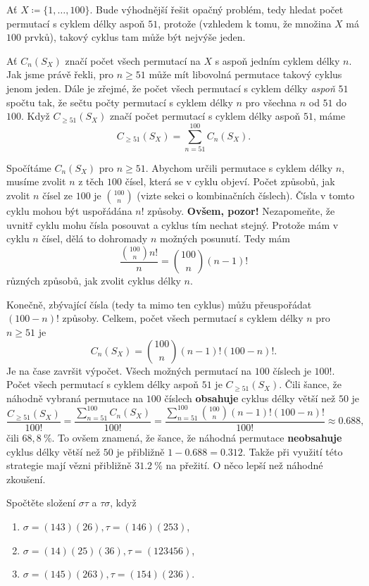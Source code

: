 Ať $X \coloneqq \{1,\ldots,100\}$. Bude výhodnější řešit opačný problém, tedy
hledat počet permutací s cyklem délky aspoň $51$, protože (vzhledem k tomu, že
množina $X$ má $100$ prvků), takový cyklus tam může být nejvýše jeden.

Ať $C_n(S_X)$ značí počet všech permutací na $X$ s aspoň jedním cyklem délky
$n$. Jak jsme právě řekli, pro $n \geq 51$ může mít libovolná permutace takový
cyklus jenom jeden. Dále je zřejmé, že počet všech permutací s cyklem délky
\emph{aspoň} $51$ spočtu tak, že sečtu počty permutací s cyklem délky $n$ pro
všechna $n$ od $51$ do $100$. Když $C_{ \geq 51}(S_X)$ značí počet permutací s
cyklem délky aspoň $51$, máme
\[
 C_{ \geq 51}(S_X) = \sum_{n=51}^{100} C_n(S_X). 
\]

Spočítáme $C_n(S_X)$ pro $n \geq 51$. Abychom určili permutace s cyklem délky
$n$, musíme zvolit $n$ z těch $100$ čísel, která se v cyklu objeví. Počet
způsobů, jak zvolit $n$ čísel ze $100$ je $\binom{100}{n}$ (vizte sekci o
kombinačních číslech). %
Čísla v tomto cyklu mohou být uspořádána $n!$ způsoby. \textbf{Ovšem, pozor!}
Nezapomeňte, že uvnitř cyklu mohu čísla posouvat a cyklus tím nechat stejný.
Protože mám v cyklu $n$ čísel, dělá to dohromady $n$ možných posunutí. Tedy mám
\[
 \frac{\binom{100}{n}n!}{n} = \binom{100}{n}(n-1)!
\]
různých způsobů, jak zvolit cyklus délky $n$.

Konečně, zbývající čísla (tedy ta mimo ten cyklus) můžu přeuspořádat $(100-n)!$
způsoby. Celkem, počet všech permutací s cyklem délky $n$ pro $n \geq 51$ je
\[
 C_n(S_X) = \binom{100}{n}(n-1)!(100-n)!.
\]
Je na čase završit výpočet. Všech možných permutací na $100$ číslech je $100!$.
Počet všech permutací s cyklem délky aspoň $51$ je $C_{\geq 51}(S_X)$. Čili šance,
že náhodně vybraná permutace na $100$ číslech \textbf{obsahuje} cyklus délky
větší než $50$ je
\[
 \frac{C_{ \geq 51}(S_X)}{100!} = \frac{\sum_{n=51}^{100} C_n(S_X)}{100!} =
 \frac{\sum_{n=51}^{100} \binom{100}{n}(n-1)!(100-n)!}{100!} \approx 0.688,
\]
čili $68,8~\%$. To ovšem znamená, že šance, že náhodná permutace
\textbf{neobsahuje} cyklus délky větší než $50$ je přibližně $1 - 0.688 =
0.312$. Takže při využití této strategie mají vězni přibližně  $31.2~\%$ na
přežití. O něco lepší než náhodné zkoušení.

\begin{exercise}
 Spočtěte složení $\sigma\tau$ a $\tau\sigma$, když
 \begin{enumerate}[topsep=0pt,label=(\arabic*)]
  \item $\sigma = (143)(26), \tau = (146)(253)$,
  \item $\sigma = (14)(25)(36), \tau = (123456)$,
  \item $\sigma = (145)(263), \tau = (154)(236)$.
 \end{enumerate}
\end{exercise}


